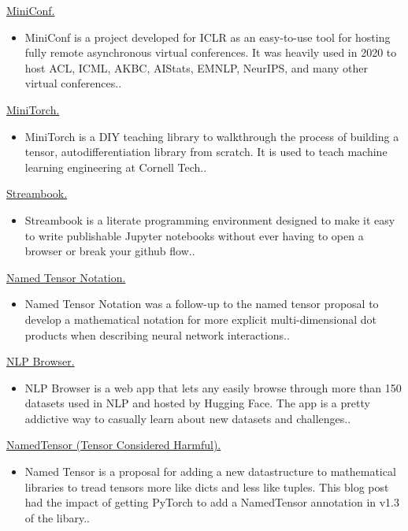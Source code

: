 \documentclass[10pt]{article}
\begin{document}
\ind \href{ paper.link } { MiniConf. }
\begin{itemize}
	\item MiniConf is a project developed for ICLR as an easy-to-use tool for hosting fully remote asynchronous virtual conferences. It was heavily used in 2020 to host ACL, ICML, AKBC, AIStats, EMNLP, NeurIPS, and many other virtual conferences..
\end{itemize}
\medskip


\ind \href{ paper.link } { MiniTorch. }
\begin{itemize}
	\item MiniTorch is a DIY teaching library to walkthrough the process of building a tensor, autodifferentiation library from scratch. It is used to teach machine learning engineering at Cornell Tech..
\end{itemize}
\medskip


\ind \href{ paper.link } { Streambook. }
\begin{itemize}
	\item Streambook is a literate programming environment designed to make it easy to write publishable Jupyter notebooks without ever having to open a browser or break your github flow..
\end{itemize}
\medskip


\ind \href{ paper.link } { Named Tensor Notation. }
\begin{itemize}
	\item Named Tensor Notation was a follow-up to the named tensor proposal to develop a mathematical notation for more explicit multi-dimensional dot products when describing neural network interactions..
\end{itemize}
\medskip


\ind \href{ paper.link } { NLP Browser. }
\begin{itemize}
	\item NLP Browser is a web app that lets any easily browse through more than 150 datasets used in NLP and hosted by Hugging Face. The app is a pretty addictive way to casually learn about new datasets and challenges..
\end{itemize}
\medskip


\ind \href{ paper.link } { NamedTensor (Tensor Considered Harmful). }
\begin{itemize}
	\item Named Tensor is a proposal for adding a new datastructure to mathematical libraries to tread tensors more like dicts and less like tuples. This blog post had the impact of getting PyTorch to add a NamedTensor annotation in v1.3 of the libary..
\end{itemize}
\medskip
\end{document}
